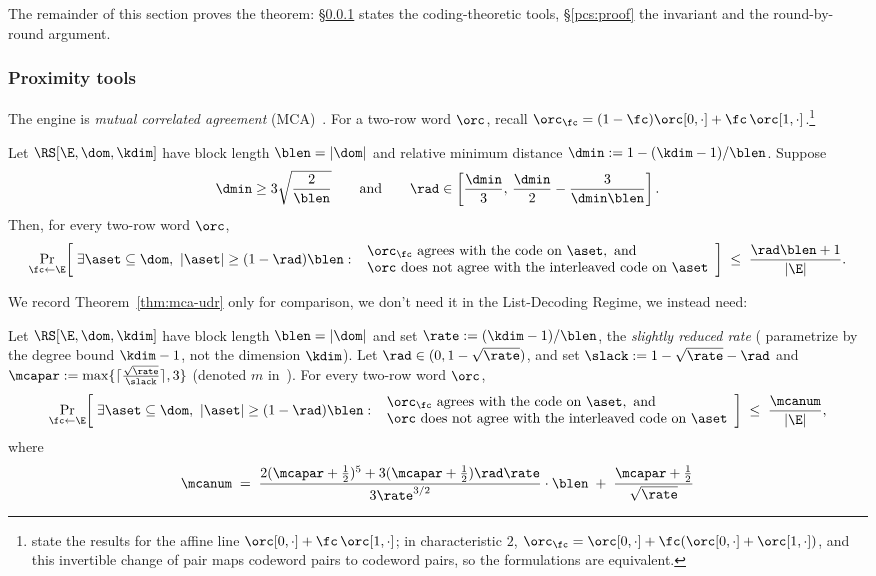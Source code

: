 The remainder of this section proves the theorem: \S\ref{sec:tools} states the coding-theoretic tools, \S\ref{pcs:proof} the invariant and the round-by-round argument.

\subsubsection{Proximity tools}\label{sec:tools}

The engine is \emph{mutual correlated agreement} (MCA)~\cite{ACFY25}. For a two-row word $\orc$, recall $\orc_\fc = (1-\fc)\orc[0,\cdot] + \fc\,\orc[1,\cdot]$.\footnote{\cite{BCHKS25} state the results for the affine line $\orc[0,\cdot] + \fc\,\orc[1,\cdot]$; in characteristic $2$, $\orc_\fc = \orc[0,\cdot] + \fc(\orc[0,\cdot] + \orc[1,\cdot])$, and this invertible change of pair maps codeword pairs to codeword pairs, so the formulations are equivalent.}

\begin{theorem}\label{thm:mca-udr}
Let $\RS[\E,\dom,\kdim]$ have block length $\blen = |\dom|$ and relative minimum distance $\dmin := 1 - (\kdim-1)/\blen$. Suppose
\[
\dmin \ge 3\sqrt{\frac{2}{\blen}}
\qquad\text{and}\qquad
\rad \in \left[\frac{\dmin}{3},\,\frac{\dmin}{2} - \frac{3}{\dmin \blen}\right].
\]
Then, for every two-row word $\orc$,
\[
\Pr_{\fc \leftarrow \E}\!\left[\; \exists \aset \subseteq \dom,\ |\aset| \ge (1-\rad) \blen :\ \begin{array}{l} \orc_\fc \text{ agrees with the code on } \aset, \text{ and} \\ \orc \text{ does not agree with the interleaved code on } \aset \end{array} \right]
\;\le\; \frac{\rad \blen + 1}{|\E|}.
\]
\end{theorem}

We record Theorem~\ref{thm:mca-udr} only for comparison, we don't need it in the List-Decoding Regime, we instead need:

\begin{theorem}\label{thm:mca-johnson}
Let $\RS[\E,\dom,\kdim]$ have block length $\blen = |\dom|$ and set $\rate := (\kdim-1)/\blen$, the \emph{slightly reduced rate} (\cite{BCHKS25} parametrize by the degree bound $\kdim - 1$, not the dimension $\kdim$). Let $\rad \in (0, 1-\sqrt{\rate})$, and set $\slack := 1 - \sqrt{\rate} - \rad$ and $\mcapar := \max\{\lceil \tfrac{\sqrt{\rate}}{\slack} \rceil, 3\}$ (denoted $m$ in~\cite{BCHKS25}). For every two-row word $\orc$,
\[
\Pr_{\fc \leftarrow \E}\!\left[\; \exists \aset \subseteq \dom,\ |\aset| \ge (1-\rad) \blen :\ \begin{array}{l} \orc_\fc \text{ agrees with the code on } \aset, \text{ and} \\ \orc \text{ does not agree with the interleaved code on } \aset \end{array} \right] \;\le\; \frac{\mcanum}{|\E|},
\]
where
\[
\mcanum \;=\; \frac{2(\mcapar + \tfrac12)^5 + 3(\mcapar + \tfrac12)\rad\rate}{3\rate^{3/2}} \cdot \blen \;+\; \frac{\mcapar + \tfrac12}{\sqrt{\rate}}
\]
\end{theorem}

